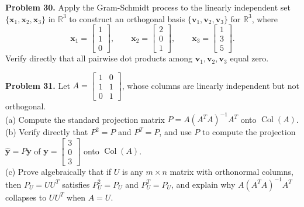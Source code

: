 \documentclass[11pt, letterpaper]{article}
\theoremstyle{definition}
\theoremstyle{remark}
\begin{document}
\textbf{Problem 30.} Apply the Gram-Schmidt process to the linearly independent set $\{\mathbf{x}_1, \mathbf{x}_2, \mathbf{x}_3\}$ in $\mathbb{R}^3$ to construct an orthogonal basis $\{\mathbf{v}_1, \mathbf{v}_2, \mathbf{v}_3\}$ for $\mathbb{R}^3$, where
\[
\mathbf{x}_1 = \begin{bmatrix} 1 \\ 1 \\ 0 \end{bmatrix}, \qquad
\mathbf{x}_2 = \begin{bmatrix} 2 \\ 0 \\ 1 \end{bmatrix}, \qquad
\mathbf{x}_3 = \begin{bmatrix} 1 \\ 3 \\ 5 \end{bmatrix}.
\]
Verify directly that all pairwise dot products among $\mathbf{v}_1, \mathbf{v}_2, \mathbf{v}_3$ equal zero.

\textbf{Problem 31.} Let $A = \begin{bmatrix} 1 & 0 \\ 1 & 1 \\ 0 & 1 \end{bmatrix}$, whose columns are linearly independent but not orthogonal. \\
(a) Compute the standard projection matrix $P = A(A^T A)^{-1}A^T$ onto $\operatorname{Col}(A)$. \\
(b) Verify directly that $P^2 = P$ and $P^T = P$, and use $P$ to compute the projection $\hat{\mathbf{y}} = P\mathbf{y}$ of $\mathbf{y} = \begin{bmatrix} 3 \\ 0 \\ 3 \end{bmatrix}$ onto $\operatorname{Col}(A)$. \\
(c) Prove algebraically that if $U$ is any $m \times n$ matrix with orthonormal columns, then $P_U = U U^T$ satisfies $P_U^2 = P_U$ and $P_U^T = P_U$, and explain why $A(A^T A)^{-1} A^T$ collapses to $U U^T$ when $A = U$.
\end{document}
